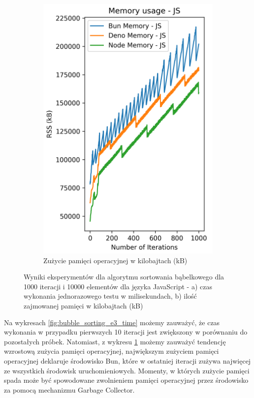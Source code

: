 \begin{figure}[H]
\begin{subfigure}[b]{0.42\textwidth}
  \end{subfigure}
  \begin{subfigure}[b]{0.42\textwidth}
    \centering
    \includegraphics[width=\textwidth]{Figures/sorting/sorting_bubble_1000_10000_js_memory.png}
    \caption{Zużycie pamięci operacyjnej w kilobajtach (kB)}
    \label{fig:bubble_sorting_e3_memory}
  \end{subfigure}
  \caption{Wyniki eksperymentów dla algorytmu sortowania bąbelkowego dla 1000 iteracji i 10000 elementów dla języka JavaScript - a) czas wykonania jednorazowego testu w milisekundach, b) ilość zajmowanej pamięci w kilobajtach (kB)}
  \label{fig:bubble_sorting_e3}
\end{figure}

Na wykresach \ref{fig:bubble_sorting_e3_time} możemy zauważyć, że czas wykonania w przypadku pierwszych 10 iteracji jest zwiększony w porównaniu do pozostałych próbek. Natomiast, z wykresu \ref{fig:bubble_sorting_e3_memory} możemy zauważyć tendencję wzrostową zużycia pamięci operacyjnej, największym zużyciem pamięci operacyjnej deklaruje środowisko Bun, które w ostatniej iteracji zużywa najwięcej ze wszystkich środowisk uruchomieniowych. Momenty, w których zużycie pamięci spada może być spowodowane zwolnieniem pamięci operacyjnej przez środowisko za pomocą mechanizmu Garbage Collector.

